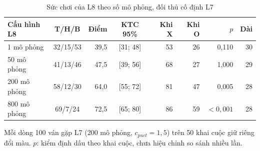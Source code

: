 \begin{table}[H]
  \centering
  \footnotesize
  \caption{Sức chơi của L8 theo số mô phỏng, đối thủ cố định L7}
  \label{tab:cs-dn-sims}
  \begin{tabular}{lcrcrrrr}
    \toprule
    Cấu hình L8 & T/H/B & Điểm & KTC 95\% & Khi X & Khi O & $p$ & Dài \\
    \midrule
    1 mô phỏng & 32/15/53 & 39,5 & [31; 48] & 53 & 26 & 0,110 & 30 \\
    50 mô phỏng & 41/13/46 & 47,5 & [39; 56] & 68 & 27 & 1,000 & 29 \\
    200 mô phỏng & 58/12/30 & 64,0 & [55; 72] & 81 & 47 & 0,005 & 28 \\
    800 mô phỏng & 69/7/24 & 72,5 & [65; 80] & 86 & 59 & $<0{,}001$ & 28 \\
    \bottomrule
  \end{tabular}
  \par\smallskip\parbox{.95\linewidth}{\footnotesize Mỗi dòng 100 ván gặp L7 (200 mô phỏng, $c_{puct}=1{,}5$) trên 50 khai cuộc giữ riêng đổi màu. $p$: kiểm định dấu theo khai cuộc, chưa hiệu chỉnh so sánh nhiều lần.}
\end{table}
